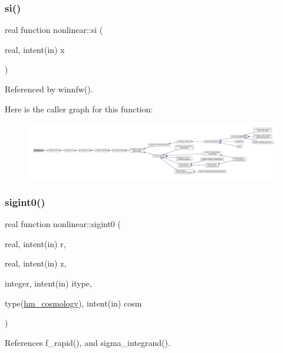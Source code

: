 \subsubsection{\texorpdfstring{si()}{si()}}
{\footnotesize\ttfamily real function nonlinear\+::si (\begin{DoxyParamCaption}\item[{real, intent(in)}]{x }\end{DoxyParamCaption})\hspace{0.3cm}{\ttfamily [private]}}



Referenced by winnfw().

Here is the caller graph for this function\+:
\nopagebreak
\begin{figure}[H]
\begin{center}
\leavevmode
\includegraphics[width=350pt]{namespacenonlinear_a6171546fb42a0d5c085c3ee5c8662e0b_icgraph}
\end{center}
\end{figure}
\mbox{\label{namespacenonlinear_ad4ec869211d722d92d942360f0619e6e}} 
\subsubsection{\texorpdfstring{sigint0()}{sigint0()}}
{\footnotesize\ttfamily real function nonlinear\+::sigint0 (\begin{DoxyParamCaption}\item[{real, intent(in)}]{r,  }\item[{real, intent(in)}]{z,  }\item[{integer, intent(in)}]{itype,  }\item[{type(\mbox{\hyperlink{structnonlinear_1_1hm__cosmology}{hm\+\_\+cosmology}}), intent(in)}]{cosm }\end{DoxyParamCaption})\hspace{0.3cm}{\ttfamily [private]}}



References f\+\_\+rapid(), and sigma\+\_\+integrand().



